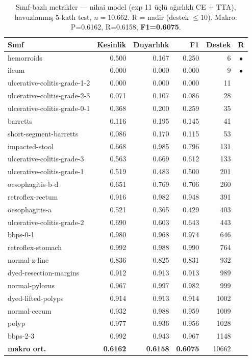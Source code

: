 \begin{table}[H]
\centering
\caption{Sınıf-bazlı metrikler --- nihai model (exp 11 üçlü ağırlıklı CE + TTA),
havuzlanmış 5-katlı test, $n=10{.}662$. R = nadir (destek $\le 10$). Makro:
P=0.6162, R=0.6158, \textbf{F1=0.6075}.}
\label{tab:perclass}
\small
\begin{tabular}{l rrr r c}
\toprule
Sınıf & Kesinlik & Duyarlılık & F1 & Destek & R \\
\midrule
hemorroids                   & 0.500 & 0.167 & 0.250 & 6    & $\bullet$ \\
ileum                        & 0.000 & 0.000 & 0.000 & 9    & $\bullet$ \\
ulcerative-colitis-grade-1-2 & 0.000 & 0.000 & 0.000 & 11   &  \\
ulcerative-colitis-grade-2-3 & 0.071 & 0.107 & 0.086 & 28   &  \\
ulcerative-colitis-grade-0-1 & 0.368 & 0.200 & 0.259 & 35   &  \\
barretts                     & 0.116 & 0.195 & 0.145 & 41   &  \\
short-segment-barretts       & 0.086 & 0.170 & 0.115 & 53   &  \\
impacted-stool               & 0.668 & 0.985 & 0.796 & 131  &  \\
ulcerative-colitis-grade-3   & 0.563 & 0.669 & 0.612 & 133  &  \\
ulcerative-colitis-grade-1   & 0.519 & 0.483 & 0.500 & 201  &  \\
oesophagitis-b-d             & 0.651 & 0.769 & 0.706 & 260  &  \\
retroflex-rectum             & 0.916 & 0.982 & 0.948 & 391  &  \\
oesophagitis-a               & 0.521 & 0.365 & 0.429 & 403  &  \\
ulcerative-colitis-grade-2   & 0.690 & 0.603 & 0.643 & 443  &  \\
bbps-0-1                     & 0.980 & 0.968 & 0.974 & 646  &  \\
retroflex-stomach            & 0.992 & 0.988 & 0.990 & 764  &  \\
normal-z-line                & 0.836 & 0.825 & 0.831 & 932  &  \\
dyed-resection-margins       & 0.912 & 0.913 & 0.913 & 989  &  \\
normal-pylorus               & 0.967 & 0.997 & 0.982 & 999  &  \\
dyed-lifted-polyps           & 0.914 & 0.913 & 0.914 & 1002 &  \\
normal-cecum                 & 0.932 & 0.988 & 0.959 & 1009 &  \\
polyp                        & 0.977 & 0.936 & 0.956 & 1028 &  \\
bbps-2-3                     & 0.992 & 0.943 & 0.967 & 1148 &  \\
\midrule
\textbf{makro ort.}          & \textbf{0.6162} & \textbf{0.6158} & \textbf{0.6075} & 10662 & \\
\bottomrule
\end{tabular}
\end{table}

